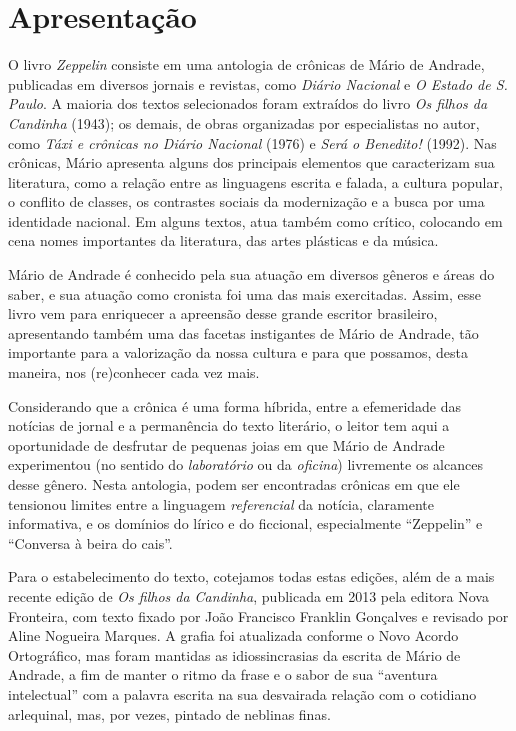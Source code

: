 \chapter[Apresentação \bigskip]{Apresentação}

O livro \emph{Zeppelin} consiste em uma antologia de crônicas de
Mário de Andrade, publicadas em diversos jornais e revistas, como
\emph{Diário Nacional} e \emph{O Estado de S. Paulo}. A maioria dos
textos selecionados foram extraídos do livro \emph{Os filhos da
Candinha} (1943); os demais, de obras organizadas por especialistas no
autor, como \emph{Táxi e crônicas no Diário Nacional} (1976) e
\emph{Será o Benedito!} (1992). Nas crônicas, Mário apresenta alguns dos
principais elementos que caracterizam sua literatura, como a relação
entre as linguagens escrita e falada, a cultura popular, o conflito de
classes, os contrastes sociais da modernização e a busca por uma
identidade nacional. Em alguns textos, atua também como crítico,
colocando em cena nomes importantes da literatura, das artes plásticas e
da música.

Mário de Andrade é conhecido pela sua atuação em diversos gêneros e
áreas do saber, e sua atuação como cronista foi uma das mais
exercitadas. Assim, esse livro vem para enriquecer a apreensão
desse grande escritor brasileiro,
apresentando também uma das facetas instigantes de Mário de Andrade,
tão importante para a valorização da nossa cultura e para
que possamos, desta maneira, nos (re)conhecer cada vez mais.

Considerando que a crônica é uma forma híbrida, entre a efemeridade das
notícias de jornal e a permanência do texto literário, o leitor tem aqui
a oportunidade de desfrutar de pequenas joias em que Mário de Andrade
experimentou (no sentido do \emph{laboratório} ou da \emph{oficina})
livremente os alcances desse gênero. Nesta antologia, podem ser
encontradas crônicas em que ele tensionou limites entre a linguagem
\emph{referencial} da notícia, claramente informativa, e os domínios do
lírico e do ficcional, especialmente ``Zeppelin'' e ``Conversa à beira
do cais''.

Para o estabelecimento do texto, cotejamos todas estas edições, além de
a mais recente edição de \emph{Os filhos da Candinha}, publicada em 2013
pela editora Nova Fronteira, com texto fixado por João Francisco
Franklin Gonçalves e revisado por Aline Nogueira Marques. A grafia foi
atualizada conforme o Novo Acordo Ortográfico, mas foram mantidas as
idiossincrasias da escrita de Mário de Andrade, a fim de manter o ritmo
da frase e o sabor de sua ``aventura intelectual'' com a palavra escrita
na sua desvairada relação com o cotidiano arlequinal, mas, por vezes,
pintado de neblinas finas.

